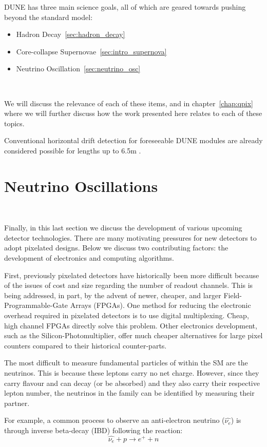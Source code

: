 DUNE has three main science goals, all of which are geared towards pushing beyond the standard model:
\begin{itemize}
    \item Hadron Decay~\ref{sec:hadron_decay}
    \item Core-collapse Supernovae~\ref{sec:intro_supernova}
    \item Neutrino Oscillation~\ref{sec:neutrino_osc}
\end{itemize}
~\label{item:dune_props}

We will discuss the relevance of each of these items, and in chapter~\ref{chap:qpix} where we will further discuss how the work presented here relates to each of these topics.

Conventional horizontal drift detection for foreseeable DUNE modules are already considered possible for lengths up to 6.5m \citep{DUNE_Vertical:Paulucci_2022}.

\section{Neutrino Oscillations}~\label{sec:neutrino_oscillation}

Finally, in this last section we discuss the development of various upcoming detector technologies.
There are many motivating pressures for new detectors to adopt pixelated designs. 
Below we discuss two contributing factors: the development of electronics and computing algorithms.

First, previously pixelated detectors have historically been more difficult because of the issues of cost and size regarding the number of readout channels.
This is being addressed, in part, by the advent of newer, cheaper, and larger Field-Programmable-Gate Arrays (FPGAs).
One method for reducing the electronic overhead required in pixelated detectors is to use digital multiplexing.
Cheap, high channel FPGAs directly solve this problem. 
Other electronics development, such as the Silicon-Photomultiplier, offer much cheaper alternatives for large pixel counters compared to their historical counter-parts.

The most difficult to measure fundamental particles of within the SM are the neutrinos.
This is because these leptons carry no net charge.
However, since they carry flavour and can decay (or be absorbed) and they also carry their respective lepton number, the neutrinos in the family can be identified by measuring their partner.

For example, a common process to observe an anti-electron neutrino ($\hat{\nu_{e}}$) is through inverse beta-decay (IBD) following the reaction:
\begin{equation}
\hat{\nu_{e}} + p \rightarrow e^{+} + n
\end{equation}

